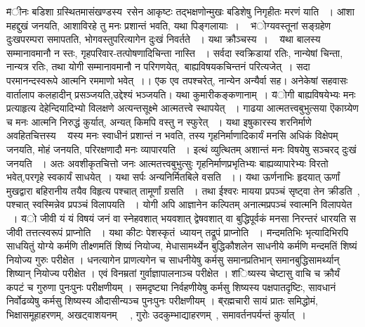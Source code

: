 {{{{{\fontsize{14}{16}\selectfont \v  मीनः बडिशा ग्रस्थितमासंखण्डस्य\footB \   रसेन आकृष्टः तद्भक्षणोन्मुखः बडिशेषु निगृहीतः मरणं याति ~।
{\fontsize{14}{16}\selectfont \v  आशा महद्दुखं जनयति, आशाविरहे तु मनः प्रशान्तं भवति, यथा पिङ्गलायाः~। \footB \ }
{\fontsize{14}{16}\selectfont \v  भोग्यवस्तूनां सङ्ग्रहेण  दुःखपरम्परा समापतति, भोगवस्तुपरित्यागेन दुःखं निवर्तते ~। यथा क्रौञ्चस्य~। \footB \ }
{\fontsize{14}{16}\selectfont \v  यथा बालस्य सम्मानावमानौ न स्तः, गृहपरिवार-तत्पोषणादिचिन्ता नास्ति ~। सर्वदा स्वक्रिडायां रतिः, नान्येषां चिन्ता, नान्यत्र रतिः, तथा योगी सम्मानावमानौ न परिगणयेत्,\footB \  बाह्यविषयकचिन्तनं परित्यजेत्~। सदा परमानन्दस्वरूपे आत्मनि रममाणो भवेत्~।।}
{\fontsize{14}{16}\selectfont \v  एक एव  तपश्चरेत्, नान्येन अन्यैर्वा सह। अनेकेषां सहवासः वार्तालाप कलहादीन् प्रसञ्जयति,उद्देश्यं भञ्जयति। यथा कुमारीकङ्कणानाम्~। 
{\fontsize{14}{16}\selectfont \v  योगी बाह्यविषयेभ्यः मनः प्रत्याहृत्य देहेन्दियादिभ्यो विलक्षणे अत्यन्तसूक्ष्मे आत्मतत्त्वे स्थापयेत् ~। गाढया आत्मतत्त्वबुभुत्सया ऎकाग्र्येण च मनः आत्मनि निरुद्धं कुर्यात्, अन्यत् किमपि वस्तु न स्फुरेत् ~। यथा इषुकारस्य शरनिर्माणे अवहितचित्तस्य \footB \ }
{\fontsize{14}{16}\selectfont \v  यस्य मनः स्वाधीनं प्रशान्तं न भवति, तस्य गृहनिर्माणादिकार्यं मनसि अधिकं विक्षेपम् जनयति, मोहं जनयति, परिरक्षणादौ मनः व्यापारयति ~। इत्थं व्युत्थितम् अशान्तं मनः विषयेषु सञ्चरद्  दुःखं जनयति ~। अतः अवशीकृतचित्तो जनः आत्मतत्त्वबुभुत्सुः गृहनिर्माणप्रभृतिभ्यः बाह्यव्यापारेभ्यः विरतो भवेत्,परगृहे स्वकार्यं साधयेत्~। यथा सर्पः अन्यनिर्मितबिले वसति ~।।}
{\fontsize{14}{16}\selectfont \v  यथा ऊर्णनाभिः हृदयात् ऊर्णां मुखद्वारा बहिरानीय तयैव विहृत्य पश्चात् तामूर्णां ग्रसति ~। तथा ईश्वरः मायया  प्रपञ्चं सृष्ट्वा तेन क्रीडति~, पश्चात्  स्वस्मिन्नेव प्रपञ्चं विलापयति ~। योगी अपि आज्ञानेन कल्पितम् अनात्मप्रपञ्चं  स्वात्मनि विलापयेत ~। }
{\fontsize{14}{16}\selectfont \v  यो जीवी यं यं विषयं जनं वा स्नेहवशात् भयवशात् द्वेषवशात् वा बुद्धिपूर्वकं मनसा निरन्तरं धारयति स  जीवी तत्तत्स्वरूपं प्राप्नोति ~। यथा कीटः पेशस्कृतं\footB \  ध्यायन् तद्रूपं प्राप्नोति ~।}
{\fontsize{14}{16}\selectfont \v मन्दमतिभिः भृत्यादिभिरपि साधयितुं योग्ये कर्मणि तीक्ष्णमतिं शिष्यं नियोज्य, मेधासामर्थ्येन बुद्धिकौशलेन साधनीये कर्मणि मन्दमतिं शिष्यं नियोज्य गुरुः परीक्षेत । धनत्यागेन प्राणत्यगेन च साधनीयेषु कर्मसु समानप्रतिभान् समानबुद्धिसामर्थ्यान् शिष्यान् नियोज्य परीक्षेत । एवं विनम्रतां गुर्वाज्ञापालनाञ्च परीक्षेत ।}
{\fontsize{14}{16}\selectfont \v शिष्यस्य चेष्टासु वाचि च क्रौर्यं कपटं च गुरुणा पुनःपुनः परीक्षणीयम् । समदृष्ट्या निर्वहणीयेषु कर्मसु  शिष्यस्य पक्षपातदृष्टिः, सावधानं निर्वोढव्येषु कर्मसु  शिष्यस्य औदासीन्यञ्च पुनःपुनः परीक्षणीयम् ।}
{\fontsize{14}{16}\selectfont \v  ब्रह्मचारी सायं प्रातः समिद्धोमं, भिक्षासमूहाहरणम्, अखट्वाशयनम् \footB \ ~, गुरोः उदकुम्भाद्याहरणम्~, समावर्तनपर्यन्तं कुर्यात्~।}
}}}}}}
